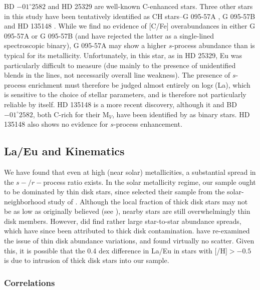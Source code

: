\documentclass[12pt,preprint]{aastex}
\begin{document}
{ BD $-01^{\circ} 2582$ and HD 25329 are well-known  C-enhanced stars.  Three  other stars in this study have been tentatively identified as CH stars--G 095-57A , G 095-57B \citep{Tomkin1999} and HD 135148 \citep{Shetrone1999, Carney2003}.  While we find no evidence  of [C/Fe] overabundances in either  G 095-57A  or G 095-57B (and have rejected the latter as a single-lined spectroscopic binary), G  095-57A  may show a higher $s$-process abundance than is typical for its metallicity.  Unfortunately, in this star,  as in HD 25329, Eu was particularly difficult to measure (due mainly to the presence of unidentified blends in the lines, not necessarily overall line weakness).  The presence of $s$-process enrichment must therefore be judged almost entirely on log$\epsilon~$(La), which is sensitive to the choice of stellar parameters, and is therefore not particularly reliable by itself.  HD 135148 is a more recent discovery, although it and BD  $-01^{\circ} 2582$, both C-rich for their M$_V$, have been identified by \citet{Carney2003} as binary stars.  HD 135148 also shows no evidence for $s$-process enhancement.



\subsection{La/Eu and Kinematics}
We have found that even at high (near solar)  metallicities, a substantial spread in the $s-/r-$process ratio exists.  In the solar metallicity regime, our sample ought to be dominated by thin disk stars, since \citet{Woolf1995} selected their sample from the solar-neighborhood study of \citet{Edvardsson1993}.  Although the local fraction of thick disk stars may not be as low as originally believed (see \citealt{Beers2002}), nearby stars are still overwhelmingly thin disk members.  However, \citet{Edvardsson1993} did find rather large star-to-star abundance spreads, which have since been attributed to thick disk contamination.  \citet{Reddy2003} have re-examined the issue of thin disk abundance variations, and found virtually no scatter.  Given this, it is possible that the  0.4 dex difference in La/Eu in stars with [/H]$>-0.5$ is due to intrusion of thick disk stars into our sample.

\subsubsection{Correlations \label {corr}}

}
\end{document}
